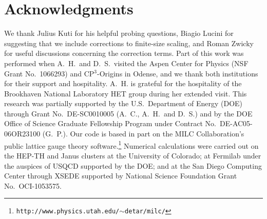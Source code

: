 \documentclass[aps,prl,twocolumn,]{revtex4}  %
\begin{document}
\section*{Acknowledgments} %
We thank Julius Kuti for his helpful probing questions, Biagio Lucini for suggesting that we include corrections to finite-size scaling, and Roman Zwicky for useful discussions concerning the correction terms.
Part of this work was performed when A.~H.\ and D.~S.\ visited the Aspen Center for Physics (NSF Grant No.~1066293) and CP$^3$-Origins in Odense, and we thank both institutions for their support and hospitality. A.~H. is grateful for the hospitality of the Brookhaven National Laboratory HET group during her extended visit.
This research was partially supported by the U.S.~Department of Energy (DOE) through Grant No.~DE-SC0010005 (A.~C., A.~H.\ and D.~S.) and by the DOE Office of Science Graduate Fellowship Program under Contract No.~DE-AC05-06OR23100 (G.~P.).
Our code is based in part on the MILC Collaboration's public lattice gauge theory software.\footnote{\texttt{http://www.physics.utah.edu/$\sim$detar/milc/}}
Numerical calculations were carried out on the HEP-TH and Janus clusters at the University of Colorado; at Fermilab under the auspices of USQCD supported by the DOE; and at the San Diego Computing Center through XSEDE supported by National Science Foundation Grant No.~OCI-1053575.



{\renewcommand{\baselinestretch}{0.86} %
  
  
}
\end{document}
